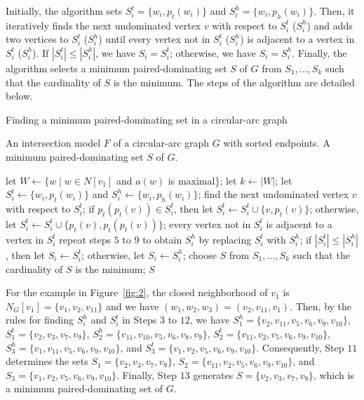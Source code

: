 \documentclass[12pt]{article}
\newcommand{\setof}[1]{\{{#1}\}}
\begin{document}
Initially, the algorithm sets $S_i^t = \setof{w_i, p_t(w_i)}$ and
$S_i^h = \setof{w_i, p_h(w_i)}$. Then, it iteratively finds
the next undominated vertex $v$ with respect to
$S_i^t$ ($S_i^h$) and adds two vertices to $S_i^t$ ($S_i^h$) until
every vertex not in $S_i^t$ ($S_i^h$) is adjacent to a vertex in
$S_i^t$ ($S_i^h$). If $|S_i^t| \le |S_i^h|$, we have
$S_i = S_i^t$; otherwise, we have $S_i = S_i^h$. Finally, the algorithm selects a minimum paired-dominating set $S$ of $G$ from
$S_1,\ldots,S_k$ such that the cardinality of $S$ is the minimum. The steps of the algorithm are detailed below.

\medskip

\begin{algorithm}
\caption{Finding a minimum paired-dominating set in a circular-arc
graph}
\begin{algorithmic} [1]
\REQUIRE An intersection model $F$ of a circular-arc graph
$G$ with sorted endpoints.
\ENSURE A minimum paired-dominating set $S$ of
$G$.

\STATE let $W \leftarrow \{w \mid w \in N[v_1]$ and $a(w)$ is maximal\};
\STATE let $k\leftarrow |W|$;
\STATE let $S_i^t \leftarrow \setof{w_i, p_t(w_i)}$ and $S_i^h \leftarrow
\setof{w_i, p_h(w_i)}$;
\REPEAT
\STATE find the next undominated vertex $v$ with respect to $S_i^t$;
\STATE if $p_t(p_t(v)) \in S_i^t$, then let $S_i^t \leftarrow S_i^t \cup \setof{v,p_t(v)}$;
\STATE otherwise, let $S_i^t \leftarrow S_i^t \cup \setof{p_t(v),p_t(p_t(v))}$;
\UNTIL every vertex not in $S_i^t$ is adjacent to a vertex in $S_i^t$
\STATE repeat steps $5$ to $9$ to obtain $S_i^h$ by replacing $S_i^t$ with $S_i^h$;
\STATE if $|S_i^t| \le |S_i^h|$, then let $S_i \leftarrow S_i^t$; otherwise, let $S_i \leftarrow S_i^h$;
\ENDFOR \STATE choose $S$ from $S_1,\ldots,S_k$ such that the cardinality of $S$ is the minimum;
\RETURN $S$
\end{algorithmic}
\end{algorithm}



For the example in Figure~\ref{fig:2}, the
closed neighborhood of $v_1$ is $N_G[v_1] = \{v_1, v_2, v_{11}\}$
and we have $(w_1, w_2, w_3) = ( v_2, v_{11}, v_1)$. Then, by the
rules for finding $S^h_{i}$ and $S^t_{i}$ in Steps $3$ to $12$, we
have $S^h_{1} = \{v_2,v_{11},v_5,v_6,v_{9},v_{10}\}$, $S^t_{1} =
\{v_2,v_3,v_7,v_9\}$, $S^h_{2} =
\{v_{11},v_{10},v_5,v_6,v_{8},v_{9}\}$,  $S^t_{2} =
\{v_{11},v_2,v_5,v_6,v_{9},v_{10}\}$, $S^h_{3} =
\{v_{1},v_{11},v_5,v_6,v_{9},v_{10}\}$, and $S^t_{3} =
\{v_1,v_2,v_5,v_6,v_9,v_{10}\}$. Consequently, Step $11$ determines the sets $S_{1} =
\{v_2,v_3,v_7,v_9\}$, $S_{2} =
\{v_{11},v_2,v_5,v_6,v_{9},v_{10}\}$, and $S_{3} =
\{v_1,v_2,v_5,v_6,v_9,v_{10}\}$. Finally, Step
$13$ generates $S = \{v_2,v_3,v_7,v_9\}$, which is a
minimum paired-dominating set of $G$.
\end{document}
